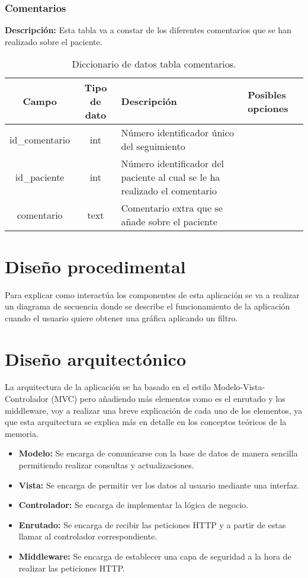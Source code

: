 \subsubsection{Comentarios}

\textbf{Descripción:} Esta tabla va a constar de los diferentes comentarios que se han realizado sobre el paciente.

\begin{longtable}{|c |c |p{3.6cm} |p{4cm} |}
\caption{Diccionario de datos tabla comentarios.}\\
\hline
\textbf{Campo} & \textbf{Tipo de dato} & \textbf{Descripción} & \textbf{Posibles opciones}\\ \hline
id\_comentario & int & Número identificador único del seguimiento &\\\hline
id\_paciente & int & Número identificador del paciente al cual se le ha realizado el comentario &\\\hline
comentario & text & Comentario extra que se añade sobre el paciente& \\\hline
\end{longtable}

\section{Diseño procedimental}

Para explicar como interactúa los componentes de esta aplicación se va a realizar un diagrama de secuencia donde se describe el funcionamiento de la aplicación cuando el usuario quiere obtener una gráfica aplicando un filtro.


\section{Diseño arquitectónico}

La arquitectura de la aplicación se ha basado en el estilo Modelo-Vista-Controlador (MVC) pero añadiendo más elementos como es el enrutado y los middleware, voy a realizar una breve explicación de cada uno de los elementos, ya que esta arquitectura se explica más en detalle en los conceptos teóricos de la memoria.

\begin{itemize}
    \item \textbf{Modelo:} Se encarga de comunicarse con la base de datos de manera sencilla permitiendo realizar consultas y actualizaciones.
    \item \textbf{Vista:} Se encarga de permitir ver los datos al usuario mediante una interfaz.
    \item \textbf{Controlador:} Se encarga de implementar la lógica de negocio.
    \item \textbf{Enrutado:} Se encarga de recibir las peticiones HTTP y a partir de estas llamar al controlador correspondiente.
    \item \textbf{Middleware:} Se encarga de establecer una capa de seguridad a la hora de realizar las peticiones HTTP.
\end{itemize}

